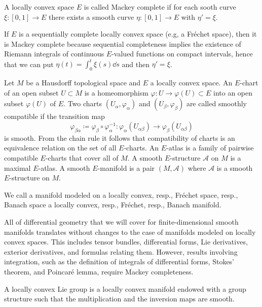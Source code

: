 \begin{defn}
    A locally convex space $E$ is called Mackey complete if for each sooth curve $\xi:[0,1]\to E$ there exists a smooth curve $\eta:[0,1]\to E$ with $\eta'=\xi$.
\end{defn}

\begin{rem}
    If $E$ is a sequentially complete locally convex space (e.g, a Fr\'echet space), then it is Mackey complete because sequential completeness implies the existence of Riemann integrals of continuous $E$-valued functions on compact intervals, hence that we can put $\eta(t)=\int_0^t \xi(s)\dd s$ and then $\eta'=\xi$.
\end{rem}

\begin{defn}
    Let $M$ be a Hausdorff topological space and $E$ a locally convex space. An $E$-chart of an open subset $U\subset M$ is a homeomorphism $\varphi:U\to \varphi(U)\subset E$ into an open subset $\varphi(U)$ of $E$. Two charts $(U_\alpha,\varphi_\alpha)$ and $(U_\beta,\varphi_\beta)$ are called smoothly compatible  if the transition map
    \[\varphi_{\beta\alpha}\coloneqq \varphi_\beta\circ\varphi_\alpha^{-1}:\varphi_\alpha(U_{\alpha\beta})\to \varphi_\beta(U_{\alpha\beta})\]
    is smooth. From the chain rule it follows that compatibility of charts is an equivalence relation on the set of all $E$-charts. An $E$-atlas is a family of pairwise compatible $E$-charts that cover all of $M$. A smooth $E$-structure $\mathcal{A}$ on $M$ is a maximal $E$-atlas. A smooth $E$-manifold is a pair $(M,\mathcal{A})$ where $\mathcal{A}$ is a smooth $E$-structure on $M$.

    We call a manifold modeled on a locally convex, resp., Fr\'echet space, resp., Banach space a locally convex, resp., Fr\'echet, resp., Banach manifold.
\end{defn}

All of differential geometry that we will cover for finite-dimensional smooth manifolds translates without changes to the case of manifolds modeled on locally convex spaces. This includes tensor bundles, differential forms, Lie derivatives, exterior derivatives, and formulas relating them. However, results involving integration, such as the definition of integrals of differential forms, Stokes' theorem, and Poincar\'e lemma, require Mackey completeness.


\begin{defn}
    A locally convex Lie group is a locally convex manifold endowed with a group structure such that the multiplication and the inversion maps are smooth.
\end{defn}

